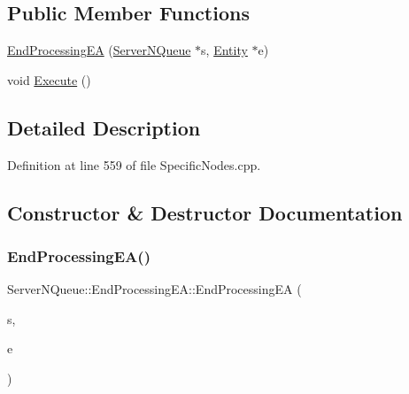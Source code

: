 \subsection*{Public Member Functions}
\begin{DoxyCompactItemize}
\item 
\hyperlink{class_server_n_queue_1_1_end_processing_e_a_aa8fbe9861955c9893ab1341d65093c02}{End\+Processing\+EA} (\hyperlink{class_server_n_queue}{Server\+N\+Queue} $\ast$s, \hyperlink{class_entity}{Entity} $\ast$e)
\item 
void \hyperlink{class_server_n_queue_1_1_end_processing_e_a_a58033da71d12b3d61bf4c48f7c470e3d}{Execute} ()
\end{DoxyCompactItemize}


\subsection{Detailed Description}


Definition at line 559 of file Specific\+Nodes.\+cpp.



\subsection{Constructor \& Destructor Documentation}
\mbox{\label{class_server_n_queue_1_1_end_processing_e_a_aa8fbe9861955c9893ab1341d65093c02}} 
\subsubsection{\texorpdfstring{End\+Processing\+E\+A()}{EndProcessingEA()}}
{\footnotesize\ttfamily Server\+N\+Queue\+::\+End\+Processing\+E\+A\+::\+End\+Processing\+EA (\begin{DoxyParamCaption}\item[{\hyperlink{class_server_n_queue}{Server\+N\+Queue} $\ast$}]{s,  }\item[{\hyperlink{class_entity}{Entity} $\ast$}]{e }\end{DoxyParamCaption})\hspace{0.3cm}{\ttfamily [inline]}}



